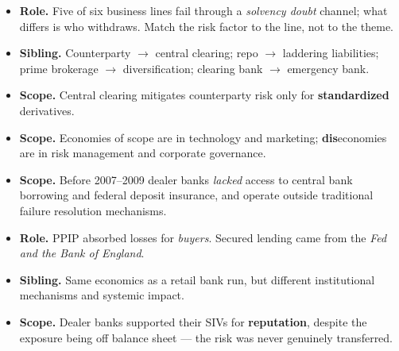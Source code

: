 \begin{lrtrapbox}
\begin{itemize}
\item \textbf{Role.} Five of six business lines fail through a \emph{solvency doubt} channel; what differs is who withdraws. Match the risk factor to the line, not to the theme.
\item \textbf{Sibling.} Counterparty $\rightarrow$ central clearing; repo $\rightarrow$ laddering liabilities; prime brokerage $\rightarrow$ diversification; clearing bank $\rightarrow$ emergency bank.
\item \textbf{Scope.} Central clearing mitigates counterparty risk only for \textbf{standardized} derivatives.
\item \textbf{Scope.} Economies of scope are in technology and marketing; \textbf{dis}economies are in risk management and corporate governance.
\item \textbf{Scope.} Before 2007--2009 dealer banks \emph{lacked} access to central bank borrowing and federal deposit insurance, and operate outside traditional failure resolution mechanisms.
\item \textbf{Role.} PPIP absorbed losses for \emph{buyers}. Secured lending came from the \emph{Fed and the Bank of England}.
\item \textbf{Sibling.} Same economics as a retail bank run, but different institutional mechanisms and systemic impact.
\item \textbf{Scope.} Dealer banks supported their SIVs for \textbf{reputation}, despite the exposure being off balance sheet --- the risk was never genuinely transferred.
\end{itemize}
\end{lrtrapbox}
